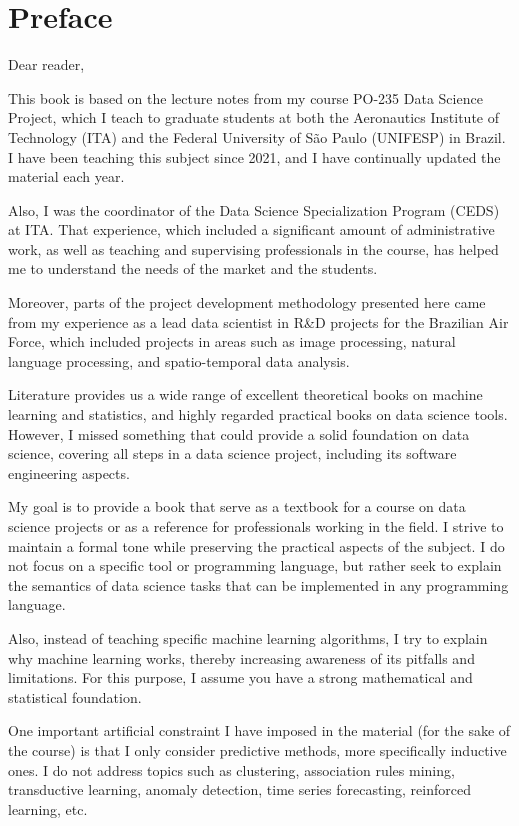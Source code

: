 \chapter{Preface}

\noindent Dear reader, \vspace{1em}

This book is based on the lecture notes from my course PO-235 Data Science Project, which
I teach to graduate students at both the Aeronautics Institute of Technology (ITA) and the
Federal University of São Paulo (UNIFESP) in Brazil.  I have been teaching this subject
since 2021, and I have continually updated the material each year.

Also, I was the coordinator of the Data Science Specialization Program (CEDS) at ITA.
That experience, which included a significant amount of administrative work, as well as teaching and
supervising professionals in the course, has helped me to understand the needs of the
market and the students.

Moreover, parts of the project development methodology presented here came from my
experience as a lead data scientist in R\&D projects for the Brazilian Air Force,
which included projects in areas such as image processing, natural language processing,
and spatio-temporal data analysis.

Literature provides us a wide range of excellent theoretical books on machine learning and
statistics, and highly regarded practical books on data science tools.  However, I missed
something that could provide a solid foundation on data science, covering all steps in a
data science project, including its software engineering aspects.

My goal is to provide a book that serve as a textbook for a course on data science
projects or as a reference for professionals working in the field.  I strive to maintain a
formal tone while preserving the practical aspects of the subject.  I do not focus on
a specific tool or programming language, but rather seek to explain the semantics of data
science tasks that can be implemented in any programming language.

Also, instead of teaching specific machine learning algorithms, I try to explain why
machine learning works, thereby increasing awareness of its pitfalls and limitations.
For this purpose, I assume you have a strong mathematical and statistical foundation.

One important artificial constraint I have imposed in the material (for the sake of the
course) is that I only consider predictive methods, more specifically inductive ones. I do
not address topics such as clustering, association rules mining, transductive learning,
anomaly detection, time series forecasting, reinforced learning, etc.

